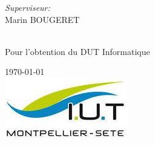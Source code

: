 \documentclass{article}
\begin{document}
\begin{titlepage}
\begin{minipage}{0.4\textwidth}
\end{minipage}
\begin{minipage}{0.4\textwidth}
\begin{flushright} \large
\emph{Superviseur:} \\
Marin \textsc{BOUGERET} %
\end{flushright}
\end{minipage}\\[1cm]

Pour l'obtention du DUT Informatique

{\large \today}\\[1cm] %
\includegraphics{.ressources/logo.jpeg}%
\vfill %
\end{titlepage}

\makeatletter
{}
\makeatother

\tableofcontents
\newpage


\end{document}
